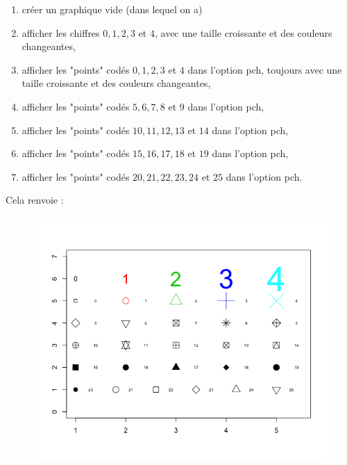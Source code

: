 \begin{enumerate}
  \item  créer un graphique vide (dans lequel on a)
  \item afficher les chiffres $0, 1, 2, 3$ et $4$, avec une taille croissante et des couleurs changeantes,
  \item  afficher les "points" codés $0, 1, 2, 3$ et $4$ dans l'option pch, toujours avec une taille croissante et des couleurs changeantes,
  \item afficher les "points" codés $5, 6, 7, 8$ et $9$ dans l'option pch,
  \item afficher les "points" codés $10, 11, 12, 13$ et $14$ dans l'option pch,
  \item afficher les "points" codés $15, 16, 17, 18$ et $19$ dans l'option pch,
  \item afficher les "points" codés $20, 21, 22, 23, 24$ et $25$ dans l'option pch.
\end{enumerate}

Cela renvoie :

\begin{figure}[H]\begin{center}\includegraphics[scale=0.4]{ilu/gra96.png}\end{center}\end{figure}



